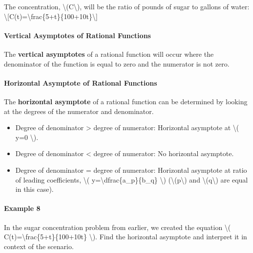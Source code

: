 The concentration, \textbackslash{}(C\textbackslash{}), will be the
ratio of pounds of sugar to gallons of water:
\textbackslash{}{[}C(t)=\textbackslash{}frac\{5+t\}\{100+10t\}\textbackslash{}{]}

\hypertarget{vertical-asymptotes-of-rational-functions}{%
\paragraph{Vertical Asymptotes of Rational
Functions}\label{vertical-asymptotes-of-rational-functions}}

The \textbf{vertical asymptotes} of a rational function will occur where
the denominator of the function is equal to zero and the numerator is
not zero.

\hypertarget{horizontal-asymptote-of-rational-functions}{%
\paragraph{Horizontal Asymptote of Rational
Functions}\label{horizontal-asymptote-of-rational-functions}}

The \textbf{horizontal asymptote} of a rational function can be
determined by looking at the degrees of the numerator and denominator.

\begin{itemize}
\tightlist
\item
  Degree of denominator \textgreater{} degree of numerator: Horizontal
  asymptote at \textbackslash{}( y=0 \textbackslash{}).
\item
  Degree of denominator \textless{} degree of numerator: No horizontal
  asymptote.
\item
  Degree of denominator = degree of numerator: Horizontal asymptote at
  ratio of leading coefficients, \textbackslash{}(
  y=\textbackslash{}dfrac\{a\_p\}\{b\_q\} \textbackslash{})
  (\textbackslash{}(p\textbackslash{}) and
  \textbackslash{}(q\textbackslash{}) are equal in this case).
\end{itemize}

\hypertarget{example-8}{%
\paragraph{Example 8}\label{example-8}}

In the sugar concentration problem from earlier, we created the equation
\textbackslash{}( C(t)=\textbackslash{}frac\{5+t\}\{100+10t\}
\textbackslash{}). Find the horizontal asymptote and interpret it in
context of the scenario.

